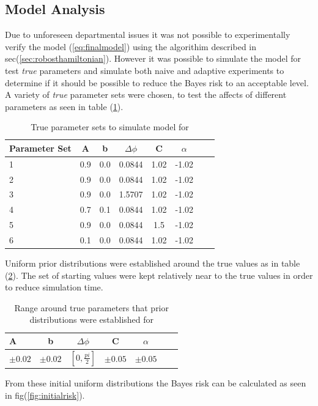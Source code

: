 \subsection{Model Analysis}
Due to unforeseen departmental issues it was not possible to experimentally verify the model (\ref{eq:finalmodel}) using the algorithim described in sec(\ref{sec:robosthamiltonian}). However it was possible to simulate the model for test \textit{true} parameters and simulate both naive and adaptive experiments to determine if it should be possible to reduce the Bayes risk to an acceptable level. A variety of \textit{true} parameter sets were chosen, to test the affects of different parameters as seen in table (\ref{tab:trueparams}). 
\begin{table}[h]
\begin{center}
\begin{tabular}{l*{6}{c}r}
Parameter Set     & A&b& $\Delta\phi$ & C & $\alpha$ \\
\hline
 1 &0.9& 0.0& 0.0844& 1.02& -1.02 \\
 2&0.9& 0.0& 0.0844& 1.02& -1.02 \\
 3&0.9& 0.0& 1.5707& 1.02& -1.02 \\
 4&0.7& 0.1& 0.0844& 1.02& -1.02 \\
 5&0.9& 0.0& 0.0844& 1.5& -1.02 \\ 
 6&0.1& 0.0& 0.0844& 1.02& -1.02 \\
\end{tabular}
\caption{True parameter sets to simulate model for}
\label{tab:trueparams}
\end{center}
\end{table}
Uniform prior distributions were established around the true values as in table (\ref{tab:around}). The set of starting values were kept relatively near to the true values in order to reduce simulation time. 
\begin{table}[h]
\begin{center}
\begin{tabular}{l*{5}{c}r}
A&b& $\Delta\phi$ & C & $\alpha$ \\
\hline
 $\pm0.02$ & $\pm0.02$ & $[0,\frac{pi}{2}]$ & $\pm0.05$ & $\pm0.05$
\end{tabular}
\caption{Range around true parameters that prior distributions were established for}
\label{tab:around}
\end{center}
\end{table}
From these initial uniform distributions the Bayes risk can be calculated as seen in fig(\ref{fig:initialrisk}).
